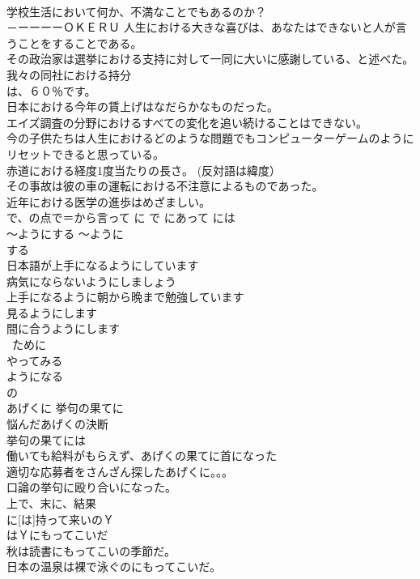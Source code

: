 \documentclass[8pt]{extreport}
\begin{document}
\begin{CJK}{UTF8}{min}
\\	学校生活において何か、不満なことでもあるのか？　
\\	－ーーーーＯＫＥＲＵ 人生における大きな喜びは、あなたはできないと人が言うことをすることである。 
\\	その政治家は選挙における支持に対して一同に大いに感謝している、と述べた。 
\\	我々の同社における持分
\\	は、６０％です。 
\\	日本における今年の賃上げはなだらかなものだった。 
\\	エイズ調査の分野におけるすべての変化を追い続けることはできない。 
\\	今の子供たちは人生におけるどのような問題でもコンピューターゲームのようにリセットできると思っている。 
\\	赤道における経度1度当たりの長さ。 (反対語は緯度） 
\\	その事故は彼の車の運転における不注意によるものであった。 
\\	近年における医学の進歩はめざましい。 
\\	で、の点で＝から言って	に で にあって には
\\	～ようにする ～ように
\\	する	
\\	日本語が上手になるようにしています 
\\	病気にならないようにしましょう 
\\	上手になるように朝から晩まで勉強しています 
\\	見るようにします 
\\	間に合うようにします　
\\	~ために 
\\	やってみる 
\\	ようになる
\\	の 
\\	あげくに 挙句の果てに	
\\	悩んだあげくの決断 
\\	挙句の果てには 
\\	働いても給料がもらえず、あげくの果てに首になった 
\\	適切な応募者をさんざん探したあげくに。。。
\\	口論の挙句に殴り合いになった。 
\\	上で、末に、結果
\\	[の]に[は]持って来いのＹ 
\\	はＹにもってこいだ 
\\	秋は読書にもってこいの季節だ。 
\\	日本の温泉は裸で泳ぐのにもってこいだ。 

\end{CJK}
\end{document}
